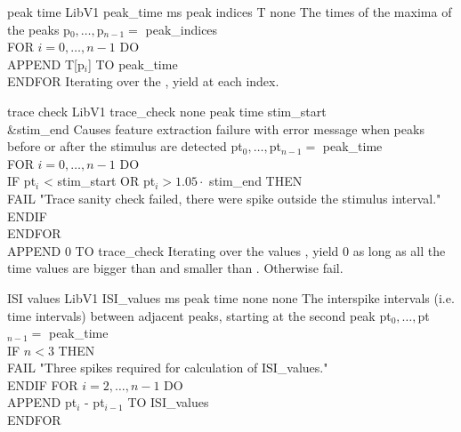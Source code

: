 \begin{efeature}
  {peak time}
  {LibV1}
  {peak\_time}
  {ms}
  {peak indices}
  {T}
  {none}
  {The times of the maxima of the peaks}
  {
  p$_0, \ldots, $p$_{n-1} =$ peak\_indices \\
  FOR $i = 0, \dots, n - 1$ DO \+ \\
    APPEND T[p$_i$] TO peak\_time \- \\
  ENDFOR
  }
  Iterating over the , yield  at each index.
  
\end{efeature}

\begin{efeature}
  {trace check}
  {LibV1}
  {trace\_check}
  {none}
  {peak time}
  {stim\_start\\&stim\_end}
  { }
  {Causes feature extraction failure with error message when peaks before or after the stimulus are detected}
  {
  pt$_0, \ldots, $pt$_{n-1} =$ peak\_time \\
  FOR $i = 0, \dots, n - 1$ DO \+ \\
    IF pt$_i$ < stim\_start OR pt$_i > 1.05 \cdot$ stim\_end THEN \+ \\
      FAIL "Trace sanity check failed, there were spike outside the stimulus interval." \- \\
    ENDIF\- \\
  ENDFOR \\
  APPEND 0 TO trace\_check
  }
  Iterating over the values , yield 0 as long as all the time values are bigger than  and smaller than . 
  Otherwise fail.
  
\end{efeature}

\begin{efeature}
  {ISI values}
  {LibV1}
  {ISI\_values}
  {ms}
  {peak time}
  {none}
  {none}
  {The interspike intervals (i.e. time intervals) between adjacent peaks, starting at the second peak}
  {
  pt$_0, \ldots, $pt$_{n-1} =$ peak\_time \\
  IF $n < 3$ THEN \+ \\
    FAIL "Three spikes required for calculation of ISI\_values." \- \\
  ENDIF
  FOR $i = 2, \dots, n - 1$ DO \+ \\
  APPEND pt$_i$ - pt$_{i-1}$ TO ISI\_values \- \\
  ENDFOR
  }
  
\end{efeature}

